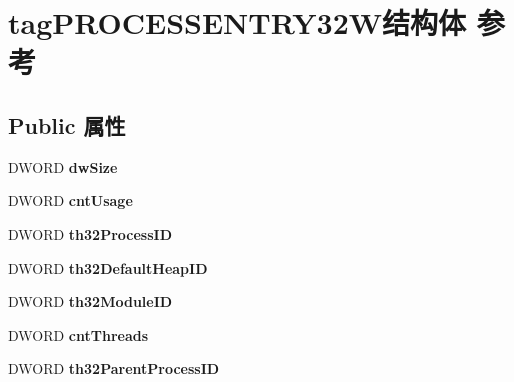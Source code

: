 \hypertarget{structtag_p_r_o_c_e_s_s_e_n_t_r_y32_w}{}\section{tag\+P\+R\+O\+C\+E\+S\+S\+E\+N\+T\+R\+Y32\+W结构体 参考}
\label{structtag_p_r_o_c_e_s_s_e_n_t_r_y32_w}
\subsection*{Public 属性}
\begin{DoxyCompactItemize}
\item 
\mbox{\label{structtag_p_r_o_c_e_s_s_e_n_t_r_y32_w_a7b130fcd46ed151c79eb63d79ba8d7b8}} 
D\+W\+O\+RD {\bfseries dw\+Size}
\item 
\mbox{\label{structtag_p_r_o_c_e_s_s_e_n_t_r_y32_w_a6cf20d7ab77c058dc956393963c7070f}} 
D\+W\+O\+RD {\bfseries cnt\+Usage}
\item 
\mbox{\label{structtag_p_r_o_c_e_s_s_e_n_t_r_y32_w_af5e533720e2686755929e038329af826}} 
D\+W\+O\+RD {\bfseries th32\+Process\+ID}
\item 
\mbox{\label{structtag_p_r_o_c_e_s_s_e_n_t_r_y32_w_a4f512185946b3cde4c0601a6dd3466db}} 
D\+W\+O\+RD {\bfseries th32\+Default\+Heap\+ID}
\item 
\mbox{\label{structtag_p_r_o_c_e_s_s_e_n_t_r_y32_w_a138752786e7fdaef3667491484d6231f}} 
D\+W\+O\+RD {\bfseries th32\+Module\+ID}
\item 
\mbox{\label{structtag_p_r_o_c_e_s_s_e_n_t_r_y32_w_a76de479eb4fc053cdbdb2937395b450c}} 
D\+W\+O\+RD {\bfseries cnt\+Threads}
\item 
\mbox{\label{structtag_p_r_o_c_e_s_s_e_n_t_r_y32_w_a392246cc8545a1b9c2d1986d127c5f22}} 
D\+W\+O\+RD {\bfseries th32\+Parent\+Process\+ID}
\item 
\mbox{\label{structtag_p_r_o_c_e_s_s_e_n_t_r_y32_w_a0dbe906762dc8c6c592f93236ab12f8f}} 

\end{DoxyCompactItemize}
